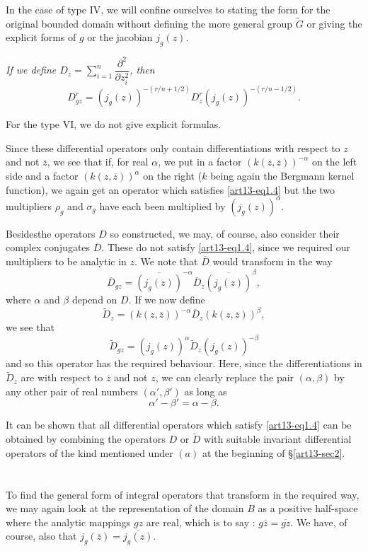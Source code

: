 In the case of type IV, we will confine ourselves to stating the form for the original bounded domain without defining the more general group $\widetilde{G}$ or giving the explicit forms of $g$ or the jacobian $j_{g}(z)$.

{\em If we define $D_{z}=\sum\limits^{n}_{i=1}\dfrac{\partial^{2}}{\partial z_{i}^{2}}$, then}
\begin{equation}
D^{r}_{gz}=(j_{g}(z))^{-(r/n+1/2)}D^{r}_{z}(j_{g}(z))^{-(r/n-1/2)}.\label{art13-eq3.15}
\end{equation}

For the type VI, we do not give explicit formulas.

Since these differential operators only contain differentiations with respect to $z$ and not $\overline{z}$, we see that if, for real $\alpha$, we put in a factor $(k(z,\overline{z}))^{-\alpha}$ on the left side and a factor $(k(z,\overline{z}))^{\alpha}$ on the right ($k$ being again the Bergmann kernel function), we again get an operator which satisfies \eqref{art13-eq1.4} but the two multipliers $\rho_{g}$ and $\sigma_{g}$ have each been multiplied by $(j_{g}(z))^{\alpha}$.

Besides\pageoriginale the operators $D$ so constructed, we may, of course, also consider their complex conjugates $\overline{D}$. These do not satisfy \eqref{art13-eq1.4}, since we required our multipliers to be analytic in $z$. We note that $\overline{D}$ would transform in the way
$$
\overline{D}_{gz}=\overline{(j_{g}(z))}^{-\alpha}\overline{D}_{z}\overline{(j_{g}(z))}^{\beta},
$$
where $\alpha$ and $\beta$ depend on $D$. If we now define
$$
\widetilde{D}_{z}=(k(z,\overline{z}))^{-\alpha}\overline{D}_{z}(k(z,\overline{z}))^{\beta},
$$
we see that
$$
\widetilde{D}_{gz}=(j_{g}(z))^{\alpha}\widetilde{D}_{z}(j_{g}(z))^{-\beta}
$$
and so this operator has the required behaviour. Here, since the differentiations in $\widetilde{D}_{z}$ are with respect to $\overline{z}$ and not $z$, we can clearly replace the pair $(\alpha,\beta)$ by any other pair of real numbers $(\alpha',\beta')$ as long as
$$
\alpha'-\beta'=\alpha-\beta.
$$

It can be shown that all differential operators which satisfy \eqref{art13-eq1.4} can be obtained by combining the operators $D$ or $\widetilde{D}$ with suitable invariant differential operators of the kind mentioned under $(a)$ at the beginning of \S\ref{art13-sec2}.

\section{}\label{art13-sec4}
To find the general form of integral operators that transform in the required way, we may again look at the representation of the domain $B$ as a positive half-space where the analytic mappings $gz$ are real, which is to say : $g\overline{z}=\overline{gz}$. We have, of course, also that $j_{g}(\overline{z})=\overline{j_{g}(z)}$.


